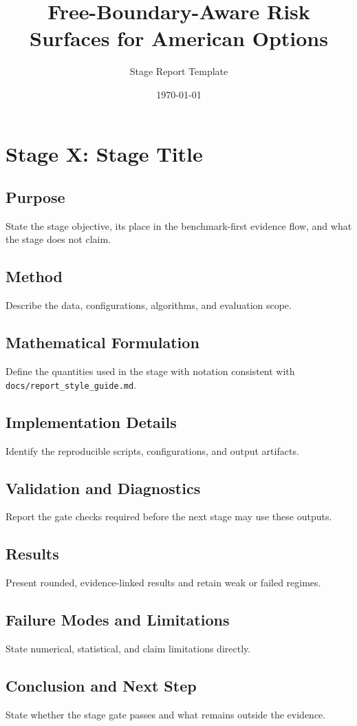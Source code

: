 \documentclass[11pt]{article}
\title{Free-Boundary-Aware Risk Surfaces for American Options}
\author{Stage Report Template}
\date{\today}
\begin{document}
\maketitle

\section{Stage X: Stage Title}
\subsection{Purpose}
State the stage objective, its place in the benchmark-first evidence flow, and
what the stage does not claim.

\subsection{Method}
Describe the data, configurations, algorithms, and evaluation scope.

\subsection{Mathematical Formulation}
Define the quantities used in the stage with notation consistent with
\texttt{docs/report\_style\_guide.md}.

\subsection{Implementation Details}
Identify the reproducible scripts, configurations, and output artifacts.

\subsection{Validation and Diagnostics}
Report the gate checks required before the next stage may use these outputs.

\subsection{Results}
Present rounded, evidence-linked results and retain weak or failed regimes.

\subsection{Failure Modes and Limitations}
State numerical, statistical, and claim limitations directly.

\subsection{Conclusion and Next Step}
State whether the stage gate passes and what remains outside the evidence.
\end{document}
